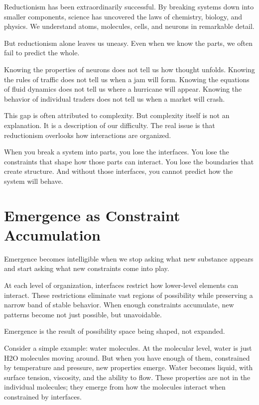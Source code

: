 \documentclass[
  openright]{book}
\begin{document}
Reductionism has been extraordinarily successful. By breaking systems
down into smaller components, science has uncovered the laws of
chemistry, biology, and physics. We understand atoms, molecules, cells,
and neurons in remarkable detail.

But reductionism alone leaves us uneasy. Even when we know the parts, we
often fail to predict the whole.

Knowing the properties of neurons does not tell us how thought unfolds.
Knowing the rules of traffic does not tell us when a jam will form.
Knowing the equations of fluid dynamics does not tell us where a
hurricane will appear. Knowing the behavior of individual traders does
not tell us when a market will crash.

This gap is often attributed to complexity. But complexity itself is not
an explanation. It is a description of our difficulty. The real issue is
that reductionism overlooks how interactions are organized.

When you break a system into parts, you lose the interfaces. You lose
the constraints that shape how those parts can interact. You lose the
boundaries that create structure. And without those interfaces, you
cannot predict how the system will behave.

\section{Emergence as Constraint
Accumulation}\label{emergence-as-constraint-accumulation}

Emergence becomes intelligible when we stop asking what new substance
appears and start asking what new constraints come into play.

At each level of organization, interfaces restrict how lower-level
elements can interact. These restrictions eliminate vast regions of
possibility while preserving a narrow band of stable behavior. When
enough constraints accumulate, new patterns become not just possible,
but unavoidable.

Emergence is the result of possibility space being shaped, not expanded.

Consider a simple example: water molecules. At the molecular level,
water is just H2O molecules moving around. But when you have enough of
them, constrained by temperature and pressure, new properties emerge.
Water becomes liquid, with surface tension, viscosity, and the ability
to flow. These properties are not in the individual molecules; they
emerge from how the molecules interact when constrained by interfaces.
\end{document}
